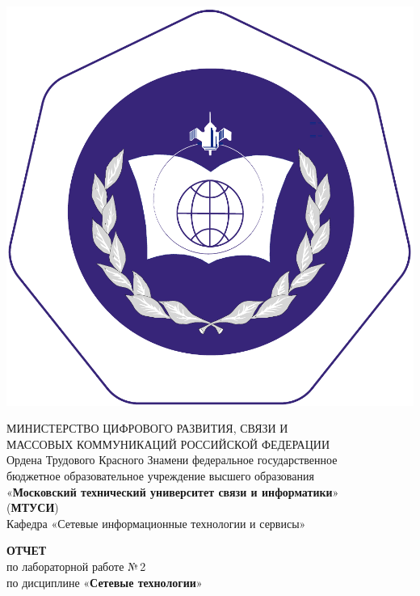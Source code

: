 \documentclass[14pt]{extarticle}
\begin{document}
{\par\centering %

\includegraphics[width=0.12\linewidth]{logo.pdf} %

МИНИСТЕРСТВО ЦИФРОВОГО РАЗВИТИЯ, СВЯЗИ И\\МАССОВЫХ КОММУНИКАЦИЙ РОССИЙСКОЙ ФЕДЕРАЦИИ\\[5mm] %

Ордена Трудового Красного Знамени федеральное государственное\\ бюджетное образовательное учреждение высшего образования\\ «\textbf{Московский технический университет связи и информатики}»\\(\textbf{МТУСИ})\\[5mm] 
	
Кафедра «Сетевые информационные технологии и сервисы»
\par}


\vfill\vfill %

{\par\centering
\textbf{ОТЧЕТ}\\ по лабораторной работе №\,2\\[5mm]

по дисциплине «\textbf{Сетевые технологии}»
\par}
\end{document}
